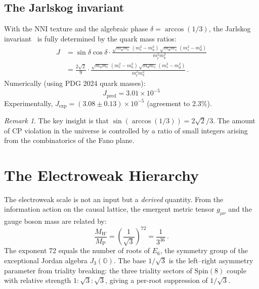 \documentclass[12pt,a4paper]{article}
\theoremstyle{definition}
\theoremstyle{remark}
\newtheorem{remark}[theorem]{Remark}
\newcommand{\Oct}{\mathbb{O}}
\newcommand{\Spin}{\mathrm{Spin}}
\newcommand{\MP}{M_{\mathrm{P}}}
\newcommand{\MW}{M_W}
\begin{document}
\subsection{The Jarlskog invariant}

With the NNI texture and the algebraic phase $\delta = \arccos(1/3)$, 
the Jarlskog invariant~\cite{Jarlskog1985} is fully determined by the 
quark mass ratios:
\begin{align}
J &= \sin\delta\cos\delta \cdot 
\frac{\sqrt{m_u m_c}\,(m_c^2 - m_u^2)\,\sqrt{m_d m_s}\,(m_s^2 - m_d^2)}
{m_t^2 m_b^2} \nonumber \\
&= \frac{2\sqrt{2}}{9}\cdot \frac{\sqrt{m_u m_c}\,(m_c^2 - m_u^2)\,
\sqrt{m_d m_s}\,(m_s^2 - m_d^2)}{m_t^2 m_b^2}\,.
\end{align}
Numerically (using PDG 2024 quark masses):
\begin{equation}
\boxed{J_{\text{pred}} = 3.01 \times 10^{-5}}
\end{equation}
Experimentally, $J_{\text{exp}} = (3.08 \pm 0.13) \times 10^{-5}$ 
(agreement to 2.3\%).

\begin{remark}
The key insight is that $\sin(\arccos(1/3)) = 2\sqrt{2}/3$. The amount 
of CP violation in the universe is controlled by a ratio of small integers 
arising from the combinatorics of the Fano plane.
\end{remark}

\section{The Electroweak Hierarchy}
\label{sec:hierarchy}

The electroweak scale is not an input but a \emph{derived} quantity. 
From the information action on the causal lattice, the emergent metric 
tensor $g_{\mu\nu}$ and the gauge boson mass are related by:
\begin{equation}
\frac{\MW}{\MP} = \left(\frac{1}{\sqrt{3}}\right)^{72} = \frac{1}{3^{36}}\,.
\end{equation}
The exponent 72 equals the number of roots of $E_6$, the symmetry group of 
the exceptional Jordan algebra $J_3(\Oct)$. The base $1/\sqrt{3}$ is the 
left--right asymmetry parameter from triality breaking: the three triality 
sectors of $\Spin(8)$ couple with relative strength $1:\sqrt{3}:\sqrt{3}$, 
giving a per-root suppression of $1/\sqrt{3}$.
\end{document}
